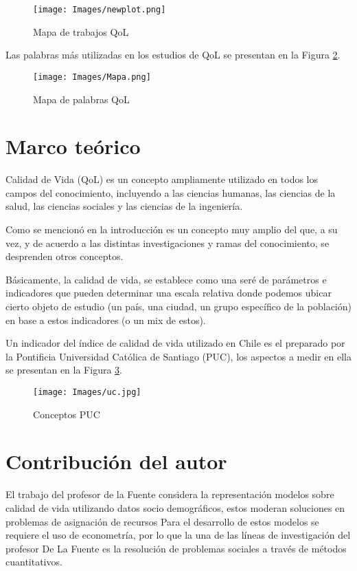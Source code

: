 \documentclass{article}
\begin{document}
\begin{figure}[H]
\texttt{[image: Images/newplot.png]}
\centering
\caption{Mapa de trabajos QoL}
\label{mapa1}
\end{figure}

Las palabras más utilizadas en los estudios de QoL se presentan en la Figura \ref{mapa2}.

\begin{figure}[H]
\texttt{[image: Images/Mapa.png]}
\centering
\caption{Mapa de palabras QoL}
\label{mapa2}
\end{figure}

\section{Marco teórico}

Calidad de Vida (QoL) es un concepto ampliamente utilizado en todos los campos del conocimiento, incluyendo a las ciencias humanas, las ciencias de la salud, las ciencias sociales y las ciencias de la ingeniería.

Como se mencionó en la introducción es un concepto muy amplio del que, a su vez, y de acuerdo a las distintas investigaciones y ramas del conocimiento, se desprenden otros conceptos.

Básicamente, la calidad de vida, se establece como una seré de parámetros e indicadores que pueden determinar una escala relativa donde podemos ubicar cierto objeto de estudio (un país, una ciudad, un grupo específico de la población) en base a estos indicadores (o un mix de estos).

Un indicador del índice de calidad de vida utilizado en Chile es el preparado por la Pontificia Universidad Católica de Santiago (PUC), los aspectos a medir en ella se presentan en la Figura \ref{UC}.

\begin{figure}[H]
\texttt{[image: Images/uc.jpg]}
\centering
\caption{Conceptos PUC}
\label{UC}
\end{figure}


\section{Contribución del autor}

El trabajo del profesor de la Fuente considera la representación modelos sobre calidad de vida  utilizando datos socio demográficos, estos moderan soluciones en problemas de asignación de recursos
Para el desarrollo de estos modelos se requiere el uso de econometría, por lo que la una de las líneas de investigación del profesor De La Fuente es la resolución de problemas sociales a través de métodos cuantitativos.
\end{document}
